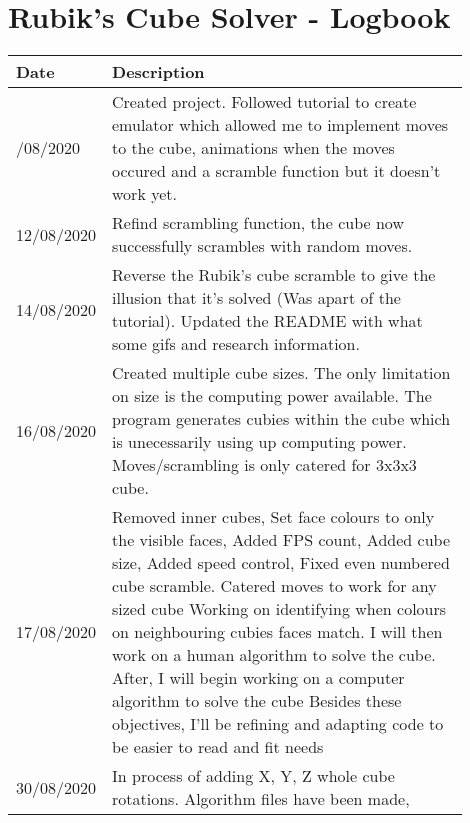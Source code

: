 \documentclass[10pt]{article} %
\begin{document}
\centering
\section*{Rubik's Cube Solver - Logbook}
\begin{table}[!ht]
    \centering
    \begin{tabular}{
        |>{\centering\arraybackslash}p{0.1\linewidth}
        |p{0.8\linewidth}|}
    \hline
    \textbf{Date} & \textbf{Description} \\ \hline
    10/08/2020   & 
    Created project. Followed tutorial to create emulator which allowed me to implement moves to the cube, animations when the moves occured and a scramble function but it doesn't work yet.            
    \\ \hline
    12/08/2020   &
    Refind scrambling function, the cube now successfully scrambles with random moves.
    \\ \hline
    14/08/2020  &
    Reverse the Rubik's cube scramble to give the illusion that it's solved (Was apart of the tutorial). Updated the README with what some gifs and research information.
    \\ \hline
    16/08/2020  &
    Created multiple cube sizes. The only limitation on size is the computing power available. The program generates cubies within the cube which is unecessarily using up computing power. Moves/scrambling is only catered for 3x3x3 cube.
    \\ \hline
    17/08/2020  &
    Removed inner cubes,   \newline
    Set face colours to only the visible faces,    \newline
    Added FPS count,   \newline
    Added cube size,   \newline
    Added speed control,   \newline
    Fixed even numbered cube scramble.   \newline
    Catered moves to work for any sized cube
    Working on identifying when colours on neighbouring cubies faces match.
    I will then work on a human algorithm to solve the cube.
    After, I will begin working on a computer algorithm to solve the cube
    Besides these objectives, I'll be refining and adapting code to be easier to read and fit needs
    \\ \hline
    30/08/2020  &
    In process of adding X, Y, Z whole cube rotations.
    Algorithm files have been made, \newline

\end{tabular}
\end{table}
\end{document}
